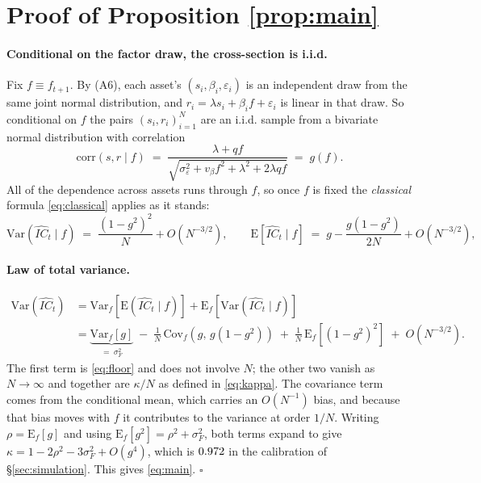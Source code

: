 \documentclass[11pt,a4paper]{article}
\newcommand{\ICh}{\widehat{IC}}
\newcommand{\sF}{\sigma_F}
\begin{document}
\appendix

\section{Proof of Proposition \ref{prop:main}}\label{app:proof}

\paragraph{Conditional on the factor draw, the cross-section is i.i.d.}
Fix $f \equiv f_{t+1}$. By (A6), each asset's $(s_i, \beta_i, \varepsilon_i)$ is an
independent draw from the same joint normal distribution, and
$r_i = \lambda s_i + \beta_i f + \varepsilon_i$ is linear in that draw. So conditional
on $f$ the pairs $(s_i, r_i)_{i=1}^{N}$ are an i.i.d. sample from a bivariate normal
distribution with correlation
\begin{equation*}
\mathrm{corr}(s, r \mid f) \;=\; \frac{\lambda + qf}{\sqrt{\sigma_\varepsilon^2 + v_\beta f^2 + \lambda^2 + 2\lambda qf}} \;=\; g(f).
\end{equation*}
All of the dependence across assets runs through $f$, so once $f$ is fixed the
\emph{classical} formula \eqref{eq:classical} applies as it stands:
\begin{equation}
\mathrm{Var}(\ICh_t \mid f) \;=\; \frac{\left(1 - g^2\right)^2}{N} + O(N^{-3/2}),
\qquad
\mathrm{E}[\ICh_t \mid f] \;=\; g - \frac{g\left(1 - g^2\right)}{2N} + O(N^{-3/2}),
\label{eq:conditional}
\end{equation}

\paragraph{Law of total variance.}
\begin{align*}
\mathrm{Var}(\ICh_t)
&= \mathrm{Var}_f\!\left[\mathrm{E}(\ICh_t \mid f)\right]
 + \mathrm{E}_f\!\left[\mathrm{Var}(\ICh_t \mid f)\right] \\[0.2em]
&= \underbrace{\mathrm{Var}_f\!\left[g\right]}_{=\;\sF^2}
 \;-\; \frac{1}{N}\,\mathrm{Cov}_f\!\left(g,\, g\left(1-g^2\right)\right)
 \;+\; \frac{1}{N}\,\mathrm{E}_f\!\left[\left(1-g^2\right)^2\right]
 \;+\; O(N^{-3/2}).
\end{align*}
The first term is \eqref{eq:floor} and does not involve $N$; the other two vanish as
$N \to \infty$ and together are $\kappa/N$ as defined in \eqref{eq:kappa}. The covariance
term comes from the conditional mean, which carries an $O(N^{-1})$ bias, and
because that bias moves with $f$ it contributes to the variance at order $1/N$. Writing
$\rho = \mathrm{E}_f[g]$ and using $\mathrm{E}_f[g^2] = \rho^2 + \sF^2$, both terms expand
to give $\kappa = 1 - 2\rho^2 - 3\sF^2 + O(g^4)$, which is $0.972$ in the calibration
of \S\ref{sec:simulation}. This gives \eqref{eq:main}. \hfill$\square$
\end{document}
